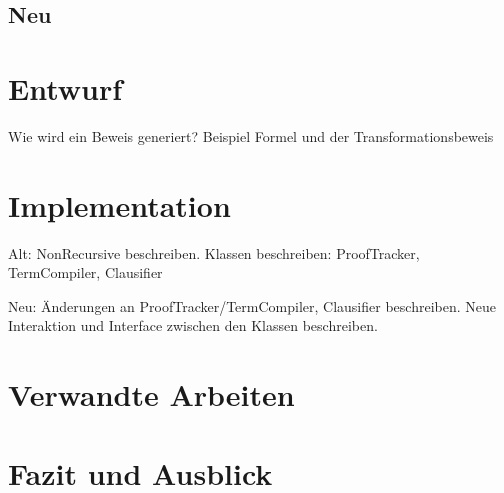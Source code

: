 \documentclass[a4paper]{article}
\begin{document}
\subsection{Neu}

\section{Entwurf}

Wie wird ein Beweis generiert?
Beispiel Formel und der Transformationsbeweis

\section{Implementation}

Alt:
NonRecursive beschreiben.
Klassen beschreiben: ProofTracker, TermCompiler, Clausifier

Neu:
Änderungen an ProofTracker/TermCompiler, Clausifier beschreiben.
Neue Interaktion und Interface zwischen den Klassen beschreiben.


\section{Verwandte Arbeiten}

\section{Fazit und Ausblick}


\end{document}
